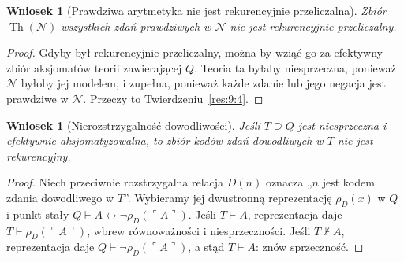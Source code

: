 \documentclass[11pt,a4paper]{article}
\numberwithin{equation}{section}
\theoremstyle{plain}
\newtheorem{wniosek}[twierdzenie]{Wniosek}
\theoremstyle{definition}
\theoremstyle{remark}
\begin{document}
\begin{wniosek}[Prawdziwa arytmetyka nie jest rekurencyjnie przeliczalna]\label{res:9:5}
Zbiór $\operatorname{Th}(\mathcal N)$ wszystkich zdań prawdziwych w $\mathcal N$ nie jest rekurencyjnie przeliczalny.
\end{wniosek}
\begin{proof}
Gdyby był rekurencyjnie przeliczalny, można by wziąć go za efektywny zbiór aksjomatów teorii zawierającej $Q$. Teoria ta byłaby niesprzeczna, ponieważ $\mathcal N$ byłoby jej modelem, i zupełna, ponieważ każde zdanie lub jego negacja jest prawdziwe w $\mathcal N$. Przeczy to Twierdzeniu~\ref{res:9:4}.
\end{proof}

\begin{wniosek}[Nierozstrzygalność dowodliwości]\label{res:9:6}
Jeśli $T\supseteq Q$ jest niesprzeczna i efektywnie aksjomatyzowalna, to zbiór kodów zdań dowodliwych w $T$ nie jest rekurencyjny.
\end{wniosek}
\begin{proof}
Niech przeciwnie rozstrzygalna relacja $D(n)$ oznacza „$n$ jest kodem zdania dowodliwego w $T$”. Wybieramy jej dwustronną reprezentację $\rho_D(x)$ w $Q$ i punkt stały $Q\vdash A\leftrightarrow\neg\rho_D(\ulcorner A\urcorner)$. Jeśli $T\vdash A$, reprezentacja daje $T\vdash\rho_D(\ulcorner A\urcorner)$, wbrew równoważności i niesprzeczności. Jeśli $T\nvdash A$, reprezentacja daje $Q\vdash\neg\rho_D(\ulcorner A\urcorner)$, a stąd $T\vdash A$: znów sprzeczność.
\end{proof}
\end{document}
